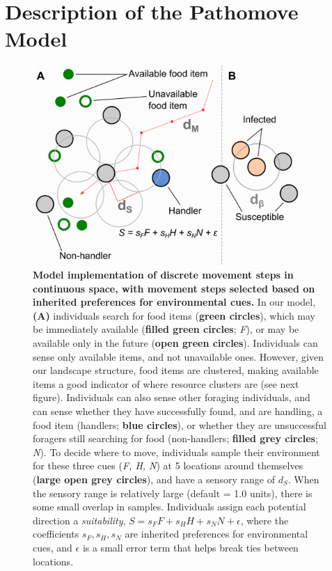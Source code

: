 \section*{Description of the Pathomove Model}

\begin{figure}[!h]
    \centering
    \includegraphics[width=0.9\textwidth]{figures/pathomove/fig_schematic.png}
    \caption{
        \textbf{Model implementation of discrete movement steps in continuous space, with movement steps selected based on inherited preferences for environmental cues.} 
        In our model, \textbf{(A)} individuals search for food items (\textbf{green circles}), which may be immediately available (\textbf{filled green circles}; \emph{F}), or may be available only in the future (\textbf{open green circles}). 
        Individuals can sense only available items, and not unavailable ones. However, given our landscape structure, food items are clustered, making available items a good indicator of where resource clusters are (see next figure). 
        Individuals can also sense other foraging individuals, and can sense whether they have successfully found, and are handling, a food item (handlers; \textbf{blue circles}), or whether they are unsuccessful foragers still searching for food (non-handlers; \textbf{filled grey circles}; \emph{N}). 
        To decide where to move, individuals sample their environment for these three cues (\emph{F, H, N}) at 5 locations around themselves (\textbf{large open grey circles}), and have a sensory range of \(d_S\). 
        When the sensory range is relatively large (default = 1.0 units), there is some small overlap in samples. 
        Individuals assign each potential direction a \emph{suitability}, \(S = s_FF + s_HH + s_NN + \epsilon\), where the coefficients \(s_F, s_H, s_N\) are inherited preferences for environmental cues, and \(\epsilon\) is a small error term that helps break ties between locations. 
}
\end{figure}
